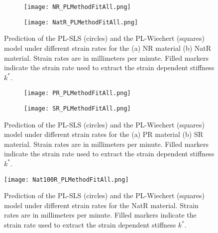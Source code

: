 \begin{figure}[H]
	\centering
	\begin{subfigure}[b]{0.9\textwidth}
		\centering
		\texttt{[image: NR\_PLMethodFitAll.png]}
		\caption{}
		\label{fig:FitAllNR}
	\end{subfigure}
	\begin{subfigure}[b]{0.9\textwidth}
		\centering
		\texttt{[image: NatR\_PLMethodFitAll.png]}
		\caption{}
		\label{fig:FitAllNatR}
	\end{subfigure}
	\caption{Prediction of the PL-SLS (circles) and the PL-Wiechert (squares) model under different strain rates for the (a) NR material (b) NatR material. Strain rates are in millimeters per minute. Filled markers indicate the strain rate used to extract the strain dependent stiffness $k^*$. }
	\label{fig:FitAllNR_NatR}
\end{figure}

\begin{figure}[H]
	\centering
	\begin{subfigure}[b]{0.9\textwidth}
		\centering
		\texttt{[image: PR\_PLMethodFitAll.png]}
		\caption{}
		\label{fig:FitAllPR}
	\end{subfigure}
	\begin{subfigure}[b]{0.9\textwidth}
		\centering
		\texttt{[image: SR\_PLMethodFitAll.png]}
		\caption{}
		\label{fig:FitAllSR}
	\end{subfigure}
	\caption{Prediction of the PL-SLS (circles) and the PL-Wiechert (squares) model under different strain rates for the (a) PR material (b) SR material. Strain rates are in millimeters per minute. Filled markers indicate the strain rate used to extract the strain dependent stiffness $k^*$.}
	\label{fig:FitAllPR_SR}
\end{figure}

\begin{figure}[H]
	\centering
	\texttt{[image: Nat100R\_PLMethodFitAll.png]}
	\caption{Prediction of the PL-SLS (circles) and the PL-Wiechert (squares) model under different strain rates for the NatR material. Strain rates are in millimeters per minute. Filled markers indicate the strain rate used to extract the strain dependent stiffness $k^*$.}
	\label{fig:FitAllNat100R}
\end{figure}

